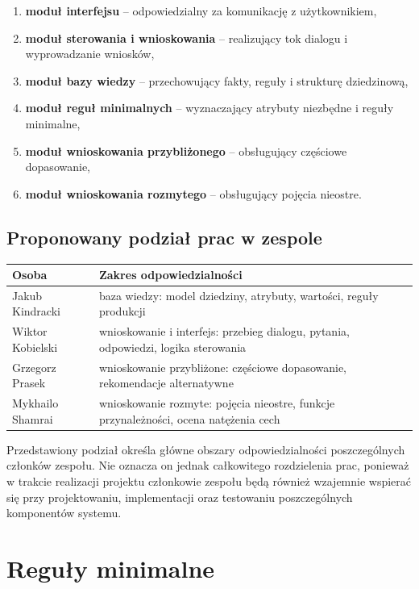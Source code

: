 \documentclass[12pt,a4paper,oneside]{article}
\begin{document}
\begin{enumerate}[leftmargin=1.2cm]
    \item \textbf{moduł interfejsu} – odpowiedzialny za komunikację z użytkownikiem,
    \item \textbf{moduł sterowania i wnioskowania} – realizujący tok dialogu i wyprowadzanie wniosków,
    \item \textbf{moduł bazy wiedzy} – przechowujący fakty, reguły i strukturę dziedzinową,
    \item \textbf{moduł reguł minimalnych} – wyznaczający atrybuty niezbędne i reguły minimalne,
    \item \textbf{moduł wnioskowania przybliżonego} – obsługujący częściowe dopasowanie,
    \item \textbf{moduł wnioskowania rozmytego} – obsługujący pojęcia nieostre.
\end{enumerate}

\subsection{Proponowany podział prac w zespole}

\begin{longtable}{>{\raggedright\arraybackslash}p{3.5cm} >{\raggedright\arraybackslash}p{10cm}}
\toprule
\textbf{Osoba} & \textbf{Zakres odpowiedzialności} \\
\midrule
Jakub Kindracki & baza wiedzy: model dziedziny, atrybuty, wartości, reguły produkcji \\
Wiktor Kobielski & wnioskowanie i interfejs: przebieg dialogu, pytania, odpowiedzi, logika sterowania \\
Grzegorz Prasek & wnioskowanie przybliżone: częściowe dopasowanie, rekomendacje alternatywne \\
Mykhailo Shamrai & wnioskowanie rozmyte: pojęcia nieostre, funkcje przynależności, ocena natężenia cech \\
\bottomrule
\end{longtable}

Przedstawiony podział określa główne obszary odpowiedzialności poszczególnych członków zespołu. Nie oznacza on jednak całkowitego rozdzielenia prac, ponieważ w trakcie realizacji projektu członkowie zespołu będą również wzajemnie wspierać się przy projektowaniu, implementacji oraz testowaniu poszczególnych komponentów systemu.
\section{Reguły minimalne}
\end{document}
